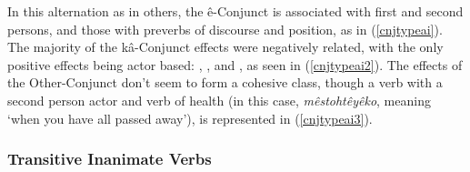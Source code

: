  
 In this alternation as in others, the ê-Conjunct is associated with first and second persons, and those with preverbs of discourse and position, as in (\ref{cnjtypeai}). The majority of the kâ-Conjunct effects were negatively related, with the only positive effects being actor based: , , and , as seen in (\ref{cnjtypeai2}). The effects of the Other-Conjunct don't seem to form a cohesive class, though a verb with a second person actor and verb of health (in this case, \textit{mêstohtêyêko}, meaning `when you have all passed away'), is represented in (\ref{cnjtypeai3}).
 
 
 
 
 
 
 \FloatBarrier
 
    \subsubsection{Transitive Inanimate Verbs}
        
